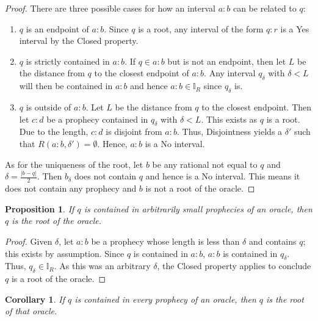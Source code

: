 \documentclass[12pt]{article}
\newtheorem{corollary}{Corollary}[section]
\newtheorem{proposition}{Proposition}[section]
\begin{document}
\begin{proof}
    There are three possible cases for how an interval $a:b$ can be related to $q$:

    \begin{enumerate}
        \item $q$ is an endpoint of $a:b$. Since $q$ is a root, any interval of the form $q:r$ is a Yes interval by the Closed property.
        \item $q$ is strictly contained in $a:b$. If $q \in a:b$ but is not an endpoint, then let $L$ be the distance from $q$ to the closest endpoint of $a:b$. Any interval $q_\delta$ with $\delta < L $ will then be contained in $a:b$ and hence $a:b \in \mathbb{I}_R$ since $q_\delta$ is. 
        \item $q$ is outside of $a:b$.  Let $L$ be the distance from $q$ to the closest endpoint. Then let $c:d$ be a prophecy contained in $q_{\delta}$ with $\delta < L$. This exists as $q$ is a root. Due to the length, $c:d$ is disjoint from $a:b$. Thus, Disjointness yields a $\delta'$ such that $R(a:b, \delta')= \emptyset$. Hence, $a:b$ is a No interval. 
    \end{enumerate}
    
    As for the uniqueness of the root, let $b$ be any rational not equal to $q$ and $\delta = \frac{|b-q|}{2}$. Then $b_\delta$ does not contain $q$ and hence is a No interval. This means it does not contain any prophecy and $b$ is not a root of the oracle. 
\end{proof}


\begin{proposition}\label{os:rootsmallpro}
    If $q$ is contained in arbitrarily small prophecies of an oracle, then $q$ is the root of the oracle. 
\end{proposition}

\begin{proof}
    Given $\delta$, let $a:b$ be a prophecy whose length is less than $\delta$ and contains $q$; this exists by assumption. Since $q$ is contained in $a:b$, $a:b$ is contained in $q_\delta$. Thus, $q_\delta \in \mathbb{I}_R$. As this was an arbitrary $\delta$, the Closed property applies to conclude  $q$ is a root of the oracle. 
\end{proof}

\begin{corollary}\label{os:root}
    If $q$ is contained in every prophecy of an oracle, then $q$ is the root of that oracle. 
\end{corollary}
\end{document}
